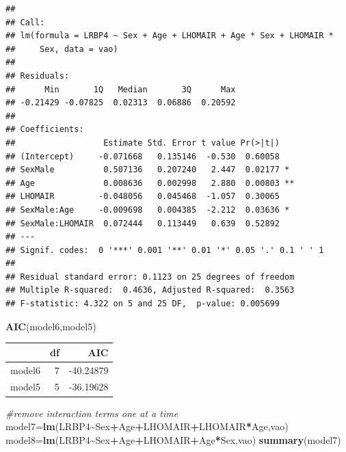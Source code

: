 \documentclass[
]{article}
\newenvironment{Shaded}{\begin{snugshade}}{\end{snugshade}}
\newcommand{\CommentTok}[1]{\textcolor[rgb]{0.56,0.35,0.01}{\textit{#1}}}
\newcommand{\FunctionTok}[1]{\textcolor[rgb]{0.13,0.29,0.53}{\textbf{#1}}}
\newcommand{\NormalTok}[1]{#1}
\newcommand{\OtherTok}[1]{\textcolor[rgb]{0.56,0.35,0.01}{#1}}
\newcommand{\SpecialCharTok}[1]{\textcolor[rgb]{0.81,0.36,0.00}{\textbf{#1}}}
\begin{document}
\begin{verbatim}
## 
## Call:
## lm(formula = LRBP4 ~ Sex + Age + LHOMAIR + Age * Sex + LHOMAIR * 
##     Sex, data = vao)
## 
## Residuals:
##      Min       1Q   Median       3Q      Max 
## -0.21429 -0.07825  0.02313  0.06886  0.20592 
## 
## Coefficients:
##                  Estimate Std. Error t value Pr(>|t|)   
## (Intercept)     -0.071668   0.135146  -0.530  0.60058   
## SexMale          0.507136   0.207240   2.447  0.02177 * 
## Age              0.008636   0.002998   2.880  0.00803 **
## LHOMAIR         -0.048056   0.045468  -1.057  0.30065   
## SexMale:Age     -0.009698   0.004385  -2.212  0.03636 * 
## SexMale:LHOMAIR  0.072444   0.113449   0.639  0.52892   
## ---
## Signif. codes:  0 '***' 0.001 '**' 0.01 '*' 0.05 '.' 0.1 ' ' 1
## 
## Residual standard error: 0.1123 on 25 degrees of freedom
## Multiple R-squared:  0.4636, Adjusted R-squared:  0.3563 
## F-statistic: 4.322 on 5 and 25 DF,  p-value: 0.005699
\end{verbatim}

\begin{Shaded}
\begin{Highlighting}[]
\FunctionTok{AIC}\NormalTok{(model6,model5)}
\end{Highlighting}
\end{Shaded}

\begin{longtable}[]{@{}lrr@{}}
\toprule\noalign{}
& df & AIC \\
\midrule\noalign{}
\endhead
\bottomrule\noalign{}
\endlastfoot
model6 & 7 & -40.24879 \\
model5 & 5 & -36.19628 \\
\end{longtable}

\begin{Shaded}
\begin{Highlighting}[]
\CommentTok{\#remove interaction terms one at a time}
\NormalTok{model7}\OtherTok{=}\FunctionTok{lm}\NormalTok{(LRBP4}\SpecialCharTok{\textasciitilde{}}\NormalTok{Sex}\SpecialCharTok{+}\NormalTok{Age}\SpecialCharTok{+}\NormalTok{LHOMAIR}\SpecialCharTok{+}\NormalTok{LHOMAIR}\SpecialCharTok{*}\NormalTok{Age,vao)}
\NormalTok{model8}\OtherTok{=}\FunctionTok{lm}\NormalTok{(LRBP4}\SpecialCharTok{\textasciitilde{}}\NormalTok{Sex}\SpecialCharTok{+}\NormalTok{Age}\SpecialCharTok{+}\NormalTok{LHOMAIR}\SpecialCharTok{+}\NormalTok{Age}\SpecialCharTok{*}\NormalTok{Sex,vao)}
\FunctionTok{summary}\NormalTok{(model7)}
\end{Highlighting}
\end{Shaded}
\end{document}
